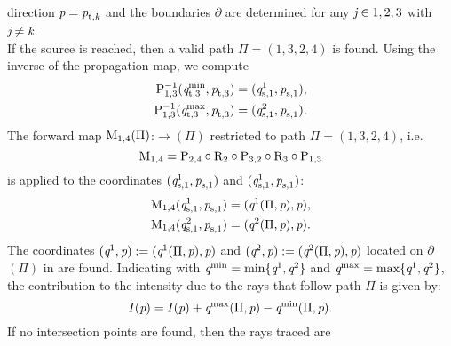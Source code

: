   direction $\textit{p}=\textit{p}_{\textrm{t,} \textit{\textit{k}}}$ and the boundaries $\partial$ are determined for any $\textit{j}\in{1,2,3}$ with $\textit{j}\neq\textit{k}$. \\ \indent
  If the source is reached, then a valid path $\Pi = (1,3,2,4)$ is found. Using the inverse of the propagation map, we compute
\begin{equation}
\begin{aligned}
\mathrm{P}_{{1,3}}^{-1}(\textit{q}_{\textrm{t,} \textit{$3$}}^\textrm{min}, \textit{p}_{\textrm{t,} \textit{$3$}}) = (\textit{q}_{\textrm{s,} \textit{$1$}}^1, \textit{p}_{\textrm{s,} \textit{$1$}}), \\ 
\mathrm{P}_{{1,3}}^{-1}(\textit{q}_{\textrm{t,} \textit{$3$}}^\textrm{max}, \textit{p}_{\textrm{t,} \textit{$3$}}) = (\textit{q}_{\textrm{s,} \textit{$1$}}^2, \textit{p}_{\textrm{s,} \textit{$1$}}).
 \end{aligned}
\end{equation} 
The forward map $\mathrm{M}_{1,4}(\Pi)$:$\rightarrow$$(\Pi)$ restricted to path $\Pi = (1,3,2,4)$, i.e.
\begin{equation}
\mathrm{M}_{1,4} = \mathrm{P}_{2,4}\circ\mathrm{R}_{2}\circ\mathrm{P}_{3,2}\circ\mathrm{R}_{3}\circ\mathrm{P}_{1,3}
\end{equation}
is applied to the coordinates $(\textit{q}_{\textrm{s,} \textit{$1$}}^{1}, \textit{p}_{\textrm{s,} \textit{$1$}})$ and $(\textit{q}_{\textrm{s,} \textit{$1$}}^{1}, \textit{p}_{\textrm{s,} \textit{$1$}})$:
\begin{equation}
\begin{split}
\mathrm{M}_{1,4}(\textit{q}_{\textrm{s,} \textit{$1$}}^{1}, \textit{p}_{\textrm{s,} \textit{$1$}}) &= (\textit{q}^{1}(\Pi, \textit{p}), \textit{p}),\\
\mathrm{M}_{1,4}(\textit{q}_{\textrm{s,} \textit{$1$}}^{2}, \textit{p}_{\textrm{s,} \textit{$1$}}) &= (\textit{q}^{2}(\Pi, \textit{p}), \textit{p}).
\end{split}
\end{equation} 
The coordinates $(\textit{q}^{1}, \textit{p}):=(\textit{q}^{1}(\Pi, \textit{p}), \textit{p})$ and
  $(\textit{q}^{2}, \textit{p}):=(\textit{q}^{2}(\Pi, \textit{p}), \textit{p})$ located on $\partial$$(\Pi)$ in  are found.
Indicating with $\textit{q}^{\textrm{min}}= \min\{\textit{q}^{1}, \textit{q}^{2}\}$ and $\textit{q}^{\textrm{max}}= \max\{\textit{q}^{1}, \textit{q}^{2}\}$, the contribution to the intensity due to the rays that follow path $\Pi$ is given by:
\begin{equation}
I(\textit{p}) = I(\textit{p})+\textit{q}^{\textrm{max}}(\Pi, \textit{p})-\textit{q}^{\textrm{min}}(\Pi, \textit{p}). 
\end{equation}
  If no intersection points are found, then the rays traced are
